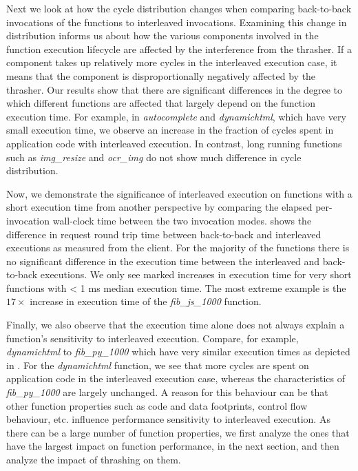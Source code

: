 Next we look at how the cycle distribution changes when comparing back-to-back invocations of the functions to interleaved invocations. Examining this change in distribution informs us about how the various components involved in the function execution lifecycle are affected by the interference from the thrasher. If a component takes up relatively more cycles in the interleaved execution case, it means that the component is disproportionally negatively affected by the thrasher. Our results show that there are significant differences in the degree to which different functions are affected that largely depend on the function execution time. For example, in \emph{autocomplete} and \emph{dynamichtml}, which have very small execution time, we observe an increase in the fraction of cycles spent in application code with interleaved execution. In contrast, long running functions such as \emph{img\_resize} and \emph{ocr\_img} do not show much difference in cycle distribution.


Now, we demonstrate the significance of interleaved execution on functions with a short execution time from another perspective by comparing the elapsed per-invocation wall-clock time between the two invocation modes.   shows the difference in request round trip time between back-to-back and interleaved executions as measured from the client. For the majority of the functions there is no significant difference in the execution time between the interleaved and back-to-back executions. We only see marked increases in execution time for very short functions  with < 1 ms median execution time. The most extreme example is the $17\times$ increase in execution time of the \emph{fib\_js\_1000} function.

Finally, we also observe that the execution time alone does not always explain a function's sensitivity to interleaved execution. Compare, for example, \emph{dynamichtml} to \emph{fib\_py\_1000} which have very similar execution times as depicted in . For the \emph{dynamichtml} function, we see that more cycles are spent on application code in the interleaved execution case, whereas the characteristics of \emph{fib\_py\_1000} are largely unchanged. A reason for this behaviour can be that other function properties such as code and data footprints, control flow behaviour, etc. influence performance sensitivity to interleaved execution. As there can be a large number of function properties, we first analyze the ones that have the largest impact on function performance, in the next section, and then analyze the impact of thrashing on them.


